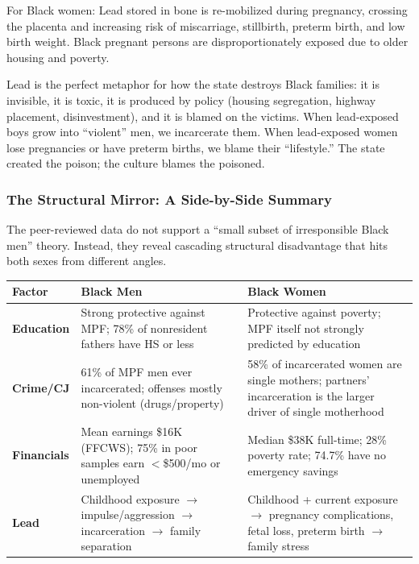 For Black women: Lead stored in bone is re-mobilized during pregnancy, crossing the placenta and increasing risk of miscarriage, stillbirth, preterm birth, and low birth weight. Black pregnant persons are disproportionately exposed due to older housing and poverty.

Lead is the perfect metaphor for how the state destroys Black families: it is invisible, it is toxic, it is produced by policy (housing segregation, highway placement, disinvestment), and it is blamed on the victims. When lead-exposed boys grow into ``violent'' men, we incarcerate them. When lead-exposed women lose pregnancies or have preterm births, we blame their ``lifestyle.'' The state created the poison; the culture blames the poisoned.

\subsubsection{The Structural Mirror: A Side-by-Side Summary}

The peer-reviewed data do not support a ``small subset of irresponsible Black men'' theory. Instead, they reveal cascading structural disadvantage that hits both sexes from different angles.

\begin{center}
\small
\begin{tabular}{p{2.4cm}p{5.0cm}p{5.0cm}}
\toprule
\textbf{Factor} & \textbf{Black Men} & \textbf{Black Women} \\
\midrule
\textbf{Education} & Strong protective against MPF; 78\% of nonresident fathers have HS or less & Protective against poverty; MPF itself not strongly predicted by education \\
\addlinespace
\textbf{Crime/CJ} & 61\% of MPF men ever incarcerated; offenses mostly non-violent (drugs/property) & 58\% of incarcerated women are single mothers; partners' incarceration is the larger driver of single motherhood \\
\addlinespace
\textbf{Financials} & Mean earnings \$16K (FFCWS); 75\% in poor samples earn $<$\$500/mo or unemployed & Median \$38K full-time; 28\% poverty rate; 74.7\% have no emergency savings \\
\addlinespace
\textbf{Lead} & Childhood exposure $\rightarrow$ impulse/aggression $\rightarrow$ incarceration $\rightarrow$ family separation & Childhood + current exposure $\rightarrow$ pregnancy complications, fetal loss, preterm birth $\rightarrow$ family stress \\
\bottomrule
\end{tabular}
\end{center}

